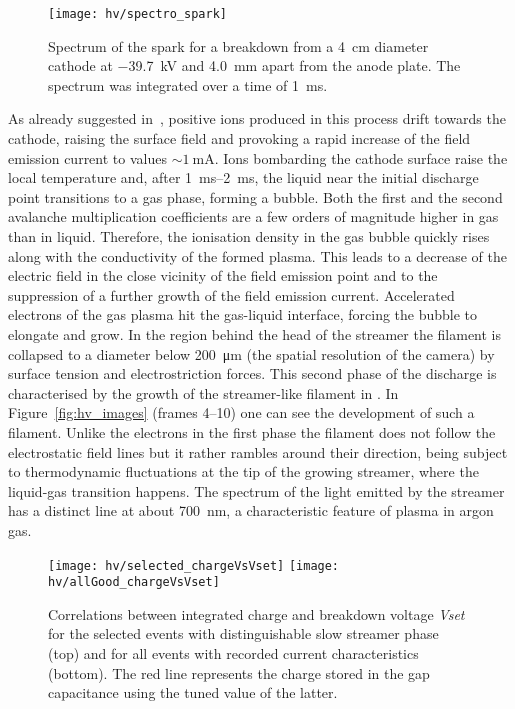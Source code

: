 \begin{figure}[tbp]
	\centering
	\texttt{[image: hv/spectro\_spark]}
	\caption[ study spark spectrum]{%
		Spectrum of the spark for a breakdown from a \SI{4}{\centi\metre} diameter cathode at \SI{-39.7}{\kilo\volt} and \SI{4.0}{\milli\metre} apart from the anode plate.
		The spectrum was integrated over a time of \SI{1}{\milli\second}.
	}
	\label{fig:hv_spectro_spark}
\end{figure}

As already suggested in~\cite{breakdown_14}, positive ions produced in this process drift towards the cathode, raising the surface field and provoking a rapid increase of the field emission current to values $\sim{\SI{1}{\milli\ampere}}$.
Ions bombarding the cathode surface raise the local temperature and, after \SIrange{1}{2}{\milli\second}, the liquid near the initial discharge point transitions to a gas phase, forming a bubble.
Both the first and the second avalanche multiplication coefficients are a few orders of magnitude higher in gas than in liquid.
Therefore, the ionisation density in the gas bubble quickly rises along with the conductivity of the formed plasma.
This leads to a decrease of the electric field in the close vicinity of the field emission point and to the suppression of a further growth of the field emission current.
Accelerated electrons of the gas plasma hit the gas-liquid interface, forcing the bubble to elongate and grow.
In the region behind the head of the streamer the filament is collapsed to a diameter below \SI{200}{\micro\metre} (the spatial resolution of the camera) by surface tension and electrostriction forces.
This second phase of the discharge is characterised by the growth of the streamer-like filament in \lar{}.
In Figure~\ref{fig:hv_images} (frames \numrange{4}{10}) one can see the development of such a filament.
Unlike the electrons in the first phase the filament does not follow the electrostatic field lines but it rather rambles around their direction, being subject to thermodynamic fluctuations at the tip of the growing streamer, where the liquid-gas transition happens.
The spectrum of the light emitted by the streamer has a distinct line at about \SI{700}{\nano\metre}, a characteristic feature of plasma in argon gas.

\begin{figure}[tbp]
	\centering
	\texttt{[image: hv/selected\_chargeVsVset]}
	\texttt{[image: hv/allGood\_chargeVsVset]}
	\caption[ study integrated charge versus breakdown voltage]{%
		Correlations between integrated charge and breakdown voltage \emph{Vset} for the selected events with distinguishable slow streamer phase (top) and for all events with recorded current characteristics (bottom).
		The red line represents the charge stored in the gap capacitance using the tuned value of the latter.
	}
	\label{fig:hv_chargeVsVset}
\end{figure}

